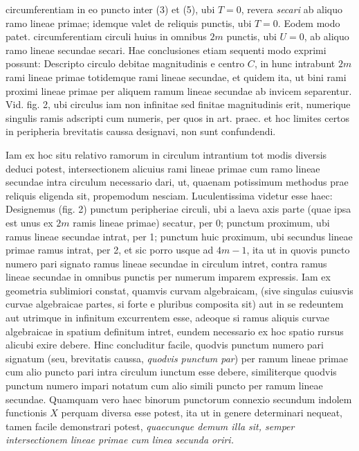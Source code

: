 circumferentiam in eo puncto inter (3) et (5), ubi $T=0$, revera \textit{secari} ab aliquo ramo lineae primae; idemque valet de reliquis punctis, ubi $T=0$. Eodem modo patet. circumferentiam circuli huius in omnibus $2m$ punctis, ubi $U=0$, ab aliquo ramo lineae secundae secari. Hae conclusiones etiam sequenti modo exprimi possunt: Descripto circulo debitae magnitudinis e centro $C$, in hunc intrabunt $2m$ rami lineae primae totidemque rami lineae secundae, et quidem ita, ut bini rami proximi lineae primae per aliquem ramum lineae secundae ab invicem separentur. Vid. fig. 2, ubi circulus iam non infinitae sed finitae magnitudinis erit, numerique singulis ramis adscripti cum numeris, per quos in art. praec. et hoc limites certos in peripheria brevitatis caussa designavi, non sunt confundendi.

 Iam ex hoc situ relativo ramorum in circulum intrantium tot modis diversis deduci potest, intersectionem alicuius rami lineae primae cum ramo lineae secundae intra circulum necessario dari, ut, quaenam potissimum methodus prae reliquis eligenda sit, propemodum nesciam. Luculentissima videtur esse haec: Designemus (fig. 2) punctum peripheriae circuli, ubi a laeva axis parte (quae ipsa est unus ex $2m$ ramis lineae primae) secatur, per 0; punctum proximum, ubi ramus lineae secundae intrat, per 1; punctum huic proximum, ubi secundus lineae primae ramus intrat, per 2, et sic porro usque ad $4m-1$, ita ut in quovis puncto numero pari signato ramus lineae secundae in circulum intret, contra ramus lineae secundae in omnibus punctis per numerum imparem expressis. Iam ex geometria sublimiori constat, quamvis curvam algebraicam, (sive singulas cuiusvis curvae algebraicae partes, si forte e pluribus composita sit) aut in se redeuntem aut utrimque in infinitum excurrentem esse, adeoque si ramus aliquis curvae algebraicae in spatium definitum intret, eundem necessario ex hoc spatio rursus alicubi exire debere. Hinc concluditur facile, quodvis punctum numero pari 
signatum (seu, brevitatis caussa, \textit{quodvis punctum par}) per ramum lineae primae cum alio puncto pari intra circulum iunctum esse debere, similiterque quodvis punctum numero impari notatum cum alio simili puncto per ramum lineae secundae. Quamquam vero haec binorum punctorum connexio secundum indolem functionis $X$ perquam diversa esse potest, ita ut in genere determinari nequeat, tamen facile demonstrari potest, \textit{quaecunque demum illa sit, semper intersectionem lineae primae cum linea secunda oriri.}


